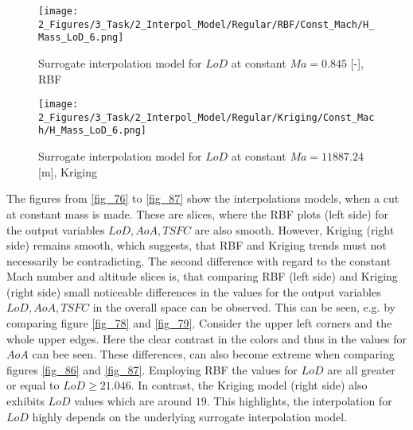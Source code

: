\begin{figure}[!h]
    \begin{minipage}[h]{0.46\textwidth}
        \centering
        \texttt{[image: 2\_Figures/3\_Task/2\_Interpol\_Model/Regular/RBF/Const\_Mach/H\_Mass\_LoD\_6.png]}
        \caption{Surrogate interpolation model for $LoD$ at constant $Ma = 0.845$ [-], RBF}
        \label{fig_74}    
    \end{minipage}
    \hfill
    \begin{minipage}{0.46\textwidth}
        \centering
        \texttt{[image: 2\_Figures/3\_Task/2\_Interpol\_Model/Regular/Kriging/Const\_Mach/H\_Mass\_LoD\_6.png]}
        \caption{Surrogate interpolation model for $LoD$ at constant $Ma = 11887.24$ [m], Kriging}
        \label{fig_75}    
    \end{minipage}
\end{figure} 


\FloatBarrier
The figures from \ref{fig_76} to \ref{fig_87} show the interpolations 
models, when a cut at constant mass is made. 
These are slices, where the RBF plots (left side)
for the output variables $LoD,AoA, TSFC$
are also smooth. 
However, Kriging (right side) remains 
smooth, which suggests, that RBF and Kriging trends
must not necessarily be contradicting.
The second difference 
with regard to the constant Mach number and altitude slices is, 
that comparing
RBF (left side) and Kriging (right side) small 
noticeable differences in the values for the output variables 
$LoD, AoA, TSFC$ in the overall space can be observed.
 This can be seen, e.g. by 
comparing figure \ref{fig_78} and \ref{fig_79}. 
Consider the upper left corners and the whole 
upper edges. Here the clear contrast 
in the colors and thus in the values 
for $AoA$ can bee seen. These  differences, can 
also become extreme when comparing figures \ref{fig_86}
and \ref{fig_87}. 
Employing RBF the values for $LoD$ are all 
greater or equal to $LoD \geq 21.046$. In contrast, 
the Kriging model (right side) also exhibits 
$LoD$ values which are around $19$. This highlights, 
the interpolation for $LoD$ highly 
depends on the underlying surrogate interpolation model.\newline

